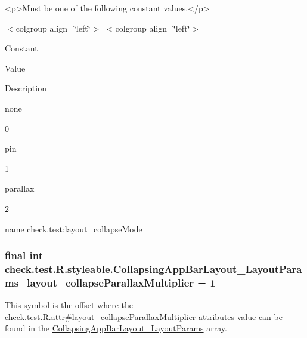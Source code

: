 \begin{DoxyVerb}      <p>Must be one of the following constant values.</p>
\end{DoxyVerb}
 \begin{TabularC}{0}
\hline
\end{TabularC}
$<$colgroup align=\char`\"{}left\char`\"{}$>$ $<$colgroup align=\char`\"{}left\char`\"{}$>$ 

Constant

Value

Description 

{\ttfamily none}

0

{\ttfamily pin}

1

{\ttfamily parallax}

2

name \hyperlink{namespacecheck_1_1test}{check.\+test}\+:layout\+\_\+collapse\+Mode \hypertarget{classcheck_1_1test_1_1_r_1_1styleable_ad6ae36504d3df9470ea2d28988011185}{}
\subsubsection[{Collapsing\+App\+Bar\+Layout\+\_\+\+Layout\+Params\+\_\+layout\+\_\+collapse\+Parallax\+Multiplier}]{\setlength{\rightskip}{0pt plus 5cm}final int check.\+test.\+R.\+styleable.\+Collapsing\+App\+Bar\+Layout\+\_\+\+Layout\+Params\+\_\+layout\+\_\+collapse\+Parallax\+Multiplier = 1\hspace{0.3cm}{\ttfamily [static]}}\label{classcheck_1_1test_1_1_r_1_1styleable_ad6ae36504d3df9470ea2d28988011185}
This symbol is the offset where the \hyperlink{classcheck_1_1test_1_1_r_1_1attr_a5528272c37ed600e150a691896da50c8}{check.\+test.\+R.\+attr\#layout\+\_\+collapse\+Parallax\+Multiplier} attribute\textquotesingle{}s value can be found in the \hyperlink{classcheck_1_1test_1_1_r_1_1styleable_a7e768556a62ed1c95f1a007062d82336}{Collapsing\+App\+Bar\+Layout\+\_\+\+Layout\+Params} array.

